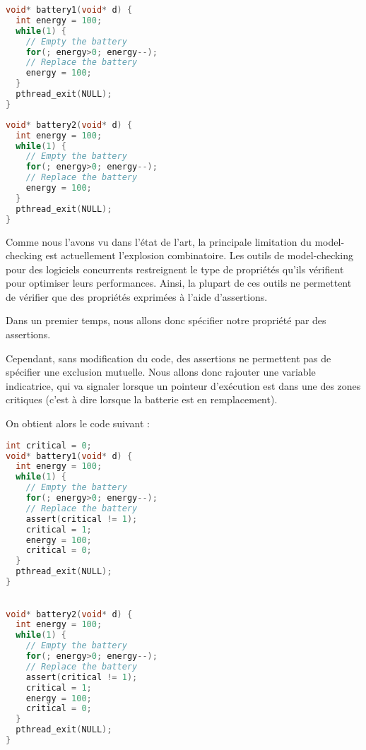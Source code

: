 \noindent\begin{minipage}{.45\textwidth}
\begin{lstlisting}[language=C, frame=single, caption=Thread 1]
void* battery1(void* d) {
  int energy = 100;
  while(1) {
    // Empty the battery
    for(; energy>0; energy--);
    // Replace the battery
    energy = 100;
  }
  pthread_exit(NULL);
}
\end{lstlisting}
\end{minipage}\hfill
\begin{minipage}{.45\textwidth}
\begin{lstlisting}[language=C, frame=single, caption=Thread 2]
void* battery2(void* d) {
  int energy = 100;
  while(1) {
    // Empty the battery
    for(; energy>0; energy--);
    // Replace the battery
    energy = 100;
  }
  pthread_exit(NULL);
}
\end{lstlisting}
\end{minipage}

Comme nous l'avons vu dans l'état de l'art, la principale limitation du
model-checking est actuellement l'explosion combinatoire. Les outils de
model-checking pour des logiciels concurrents restreignent le type de
propriétés qu'ils vérifient pour optimiser leurs performances. Ainsi, la
plupart de ces outils ne permettent de vérifier que des propriétés
exprimées à l'aide d'assertions.

Dans un premier temps, nous allons donc spécifier notre propriété par
des assertions.

Cependant, sans modification du code, des assertions ne permettent pas
de spécifier une exclusion mutuelle. Nous allons donc rajouter une
variable indicatrice, qui va signaler lorsque un pointeur d'exécution
est dans une des zones critiques (c'est à dire lorsque la batterie est
en remplacement).

On obtient alors le code suivant :

\noindent\begin{minipage}{.45\textwidth}
\begin{lstlisting}[language=C, frame=single, caption=Thread 1]
int critical = 0;
void* battery1(void* d) {
  int energy = 100;
  while(1) {
    // Empty the battery
    for(; energy>0; energy--);
    // Replace the battery
    assert(critical != 1);
    critical = 1;
    energy = 100;
    critical = 0;
  }
  pthread_exit(NULL);
}
\end{lstlisting}
\end{minipage}\hfill
\begin{minipage}{.45\textwidth}
\begin{lstlisting}[language=C, frame=single, caption=Thread 2]

void* battery2(void* d) {
  int energy = 100;
  while(1) {
    // Empty the battery
    for(; energy>0; energy--);
    // Replace the battery
    assert(critical != 1);
    critical = 1;
    energy = 100;
    critical = 0;
  }
  pthread_exit(NULL);
}
\end{lstlisting}
\end{minipage}

